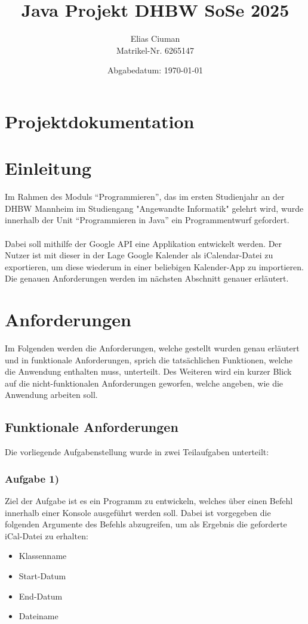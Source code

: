 \documentclass[a4paper]{article}
\title{\textbf{Java Projekt DHBW SoSe 2025}}
\author{Elias Ciuman \\ Matrikel-Nr. 6265147}
\date{Abgabedatum: \today}
\begin{document}
	\maketitle
	\tableofcontents
	
	\newpage
	
	\section*{Projektdokumentation}
	
	
	\section{Einleitung}
	Im Rahmen des Moduls ``Programmieren'', das im ersten Studienjahr an der DHBW Mannheim im Studiengang "Angewandte Informatik" gelehrt wird, wurde innerhalb der Unit ``Programmieren in Java'' ein Programmentwurf gefordert.
	\\
	\\
	Dabei soll mithilfe der Google API eine Applikation entwickelt werden. Der Nutzer ist mit dieser in der Lage Google Kalender als iCalendar-Datei zu exportieren, um diese wiederum in einer beliebigen Kalender-App zu importieren. Die genauen Anforderungen werden im nächsten Abschnitt genauer erläutert.
	
	
	\section{Anforderungen}
	Im Folgenden werden die Anforderungen, welche gestellt wurden genau erläutert und in funktionale Anforderungen, sprich die tatsächlichen Funktionen, welche die Anwendung enthalten muss, unterteilt. Des Weiteren wird ein kurzer Blick auf die nicht-funktionalen Anforderungen geworfen, welche angeben, wie die Anwendung arbeiten soll.
	
	\subsection{Funktionale Anforderungen}
	Die vorliegende Aufgabenstellung wurde in zwei Teilaufgaben unterteilt:
	
	
	\subsubsection{Aufgabe 1)}
	Ziel der Aufgabe ist es ein Programm zu entwickeln, welches über einen Befehl innerhalb einer Konsole ausgeführt werden soll. Dabei ist vorgegeben die folgenden Argumente des Befehls abzugreifen, um als Ergebnis die geforderte iCal-Datei zu erhalten:
	\begin{itemize}
		\item Klassenname
		\item Start-Datum
		\item End-Datum
		\item Dateiname
	\end{itemize}
	
\end{document}
